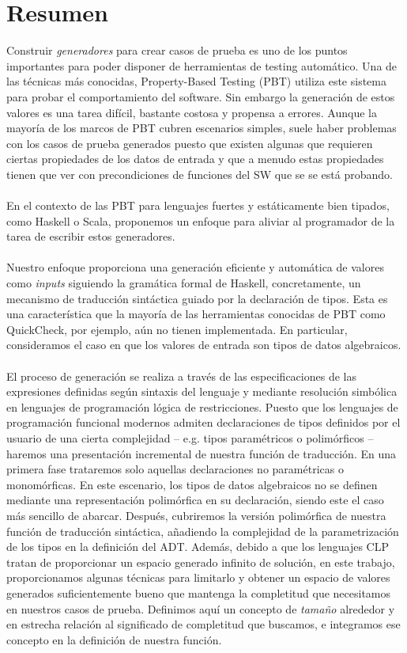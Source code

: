 \chapter*{Resumen}

Construir \textit{generadores} para crear casos de prueba es uno de los puntos importantes para poder disponer de herramientas de testing automático. Una de las técnicas más conocidas, Property-Based Testing (PBT) utiliza este sistema para probar el comportamiento del software. Sin embargo la generación de estos valores es una tarea difícil, bastante costosa y propensa a errores. Aunque la mayoría de los marcos de PBT cubren escenarios simples, suele haber problemas con los casos de prueba generados puesto que existen algunas que requieren ciertas propiedades de los datos de entrada y que a menudo estas propiedades tienen que ver con precondiciones de funciones del SW que se se está probando.
\\\\
En el contexto de las PBT para lenguajes fuertes y estáticamente bien tipados, como Haskell o Scala, proponemos un enfoque para aliviar al programador de la tarea de escribir estos generadores.\\\\
Nuestro enfoque proporciona una generación eficiente y automática de valores como \textit{inputs} siguiendo la gramática formal de Haskell, concretamente, un mecanismo de traducción sintáctica guiado por la declaración de tipos. Esta es una característica que la mayoría de las herramientas conocidas de PBT como QuickCheck, por ejemplo, aún no tienen implementada. En particular, consideramos el caso en que los valores de entrada son tipos de datos algebraicos.\\\\
El proceso de generación se realiza a través de las especificaciones de las expresiones definidas según sintaxis del lenguaje y mediante resolución simbólica en lenguajes de programación lógica de restricciones. Puesto que los lenguajes de programación funcional modernos admiten declaraciones de tipos definidos por el usuario de una cierta complejidad -- e.g. tipos paramétricos o polimórficos -- haremos una presentación incremental de nuestra función de traducción. En una primera fase trataremos solo aquellas declaraciones no paramétricas o monomórficas. En este escenario, los tipos de datos algebraicos no se definen mediante una representación polimórfica en su declaración, siendo este el caso más sencillo de abarcar. Después, cubriremos la versión polimórfica de nuestra función de traducción sintáctica, añadiendo la complejidad de la parametrización de los tipos en la definición del ADT. Además, debido a que los lenguajes CLP tratan de proporcionar un espacio generado infinito de solución, en este trabajo, proporcionamos algunas técnicas para limitarlo y obtener un espacio de valores generados suficientemente bueno que mantenga la completitud que necesitamos en nuestros casos de prueba. Definimos aquí un concepto de \textit{tamaño} alrededor y en estrecha relación al significado de completitud que buscamos, e integramos ese concepto en la definición de nuestra función.\\\\
